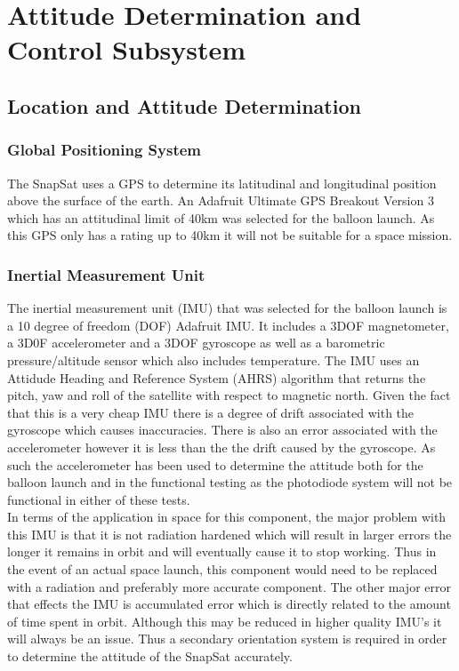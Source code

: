 \section{Attitude Determination and Control Subsystem}
\subsection{Location and Attitude Determination}
\subsubsection{Global Positioning System}
The SnapSat uses a GPS to determine its latitudinal and longitudinal position above the surface of the earth.  An Adafruit Ultimate GPS Breakout Version 3 which has an attitudinal limit of 40km was selected for the balloon launch.  As this GPS only has a rating up to 40km it will not be suitable for a space mission.  
\subsubsection{Inertial Measurement Unit}
The inertial measurement unit (IMU) that was selected for the balloon launch is a 10 degree of freedom (DOF) Adafruit IMU.  It includes a 3DOF magnetometer, a 3D0F accelerometer and a 3DOF gyroscope as well as a barometric pressure/altitude sensor which also includes temperature.  The IMU uses an Attidude Heading and Reference System (AHRS) algorithm that returns the pitch, yaw and roll of the satellite with respect to magnetic north.  Given the fact that this is a very cheap IMU there is a degree of drift associated with the gyroscope which causes inaccuracies.  There is also an error associated with the accelerometer however it is less than the the drift caused by the gyroscope. As such the accelerometer has been used to determine the attitude both for the balloon launch and in the functional testing as the photodiode system will not be functional in either of these tests.\\
In terms of the application in space for this component, the major problem with this IMU is that it is not radiation hardened which will result in larger errors the longer it remains in orbit and will eventually cause it to stop working.  Thus in the event of an actual space launch, this component would need to be replaced with a radiation and preferably more accurate component.  The other major error that effects the IMU is accumulated error which is directly related to the amount of time spent in orbit.  Although this may be reduced in higher quality IMU's it will always be an issue.  Thus a secondary orientation system is required in order to determine the attitude of the SnapSat accurately.
